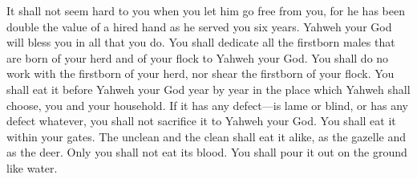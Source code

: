 {It shall not seem hard to you when you let him go free from you, for he has been double the value of a hired hand as he served you six years. Yahweh your God will bless you in all that you do.
You shall dedicate all the firstborn males that are born of your herd and of your flock to Yahweh your God. You shall do no work with the firstborn of your herd, nor shear the firstborn of your flock.
You shall eat it before Yahweh your God year by year in the place which Yahweh shall choose, you and your household.
If it has any defect—is lame or blind, or has any defect whatever, you shall not sacrifice it to Yahweh your God.
You shall eat it within your gates. The unclean and the clean shall eat it alike, as the gazelle and as the deer.
Only you shall not eat its blood. You shall pour it out on the ground like water.

}
